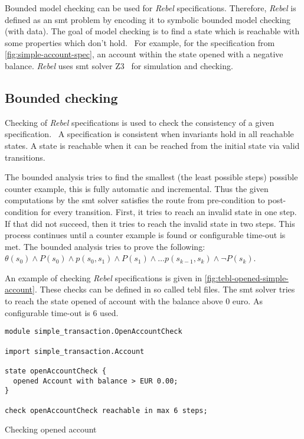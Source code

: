 Bounded model checking can be used for \textit{Rebel} specifications. Therefore, \textit{Rebel} is defined as an \gls{smt} problem by encoding it to symbolic bounded model checking (with data). The goal of model checking is to find a state which is reachable with some properties which don't hold.~\cite[p.~5]{stoel_storm_vinju_bosman_2016} For example, for the specification from \autoref{fig:simple-account-spec}, an account within the state opened with a negative balance. \textit{Rebel} uses \gls{smt} solver Z3~\cite{moura_bjorner_2008} for simulation and checking.

\subsection{Bounded checking}

Checking of \textit{Rebel} specifications is used to check the consistency of a given specification.~\cite[p.~5]{stoel_storm_vinju_bosman_2016} A specification is consistent when invariants hold in all reachable states. A state is reachable when it can be reached from the initial state via valid transitions.

The bounded analysis tries to find the smallest (the least possible steps) possible counter example, this is fully automatic and incremental. Thus the given computations by the \gls{smt} solver satisfies the route from pre-condition to post-condition for every transition.
First, it tries to reach an invalid state in one step. If that did not succeed, then it tries to reach the invalid state in two steps. This process continues until a counter example is found or configurable time-out is met. The bounded analysis tries to prove the following: $\theta (s_{0}) \land P(s_{0}) \land p(s_{0}, s_{1}) \land P(s_{1}) \land \dots p(s_{k-1}, s_{k}) \land \neg P(s_{k})$.

An example of checking \textit{Rebel} specifications is given in \autoref{fig:tebl-opened-simple-account}. These checks can be defined in so called tebl files. The \gls{smt} solver tries to reach the state opened of account with the balance above 0 euro. As configurable time-out is 6 used.

\begin{sourcecode}[h!]
\begin{lstlisting}[]
module simple_transaction.OpenAccountCheck

import simple_transaction.Account

state openAccountCheck {
  opened Account with balance > EUR 0.00;
}

check openAccountCheck reachable in max 6 steps;
\end{lstlisting}
\caption{Checking opened account}\label{fig:tebl-opened-simple-account}
\end{sourcecode}
\FloatBarrier

